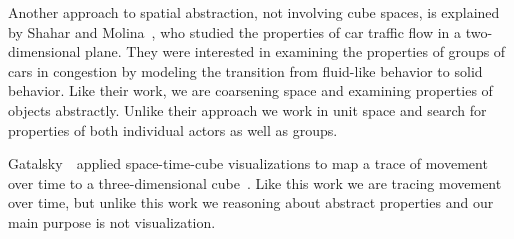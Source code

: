 Another approach to spatial abstraction, not involving cube spaces, is explained by Shahar and Molina~\cite{shahar1998knowledge}, who studied the properties of car traffic flow in a two-dimensional plane.
They were interested in examining the properties of groups of cars in congestion by modeling the transition from fluid-like behavior to solid behavior.
Like their work, we are coarsening space and examining properties of objects abstractly.
Unlike their approach we work in unit space and search for properties of both individual actors as well as groups.

Gatalsky~\etal~applied space-time-cube visualizations to map a trace of movement over time to a three-dimensional cube~\cite{gatalsky2004interactive}.
Like this work we are tracing movement over time, but unlike this work we reasoning about abstract properties and our main purpose is not visualization.


